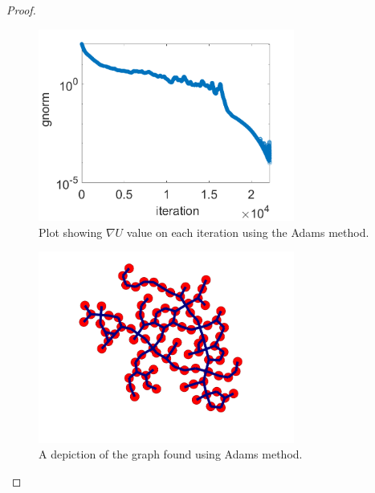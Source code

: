 \documentclass[12pt]{report}
\newenvironment{problem}{}{\newpage}
\begin{document}
\begin{problem}
\begin{proof}
\begin{figure}[h!]
    \centering
    \includegraphics[width=0.75\textwidth,height=\textwidth,keepaspectratio]{images/coolplot2.png}
    \caption{Plot showing $\nabla U$ value on each iteration using the Adams method.}
    \label{fig1}
\end{figure}

\begin{figure}[h!]
    \centering
    \includegraphics[width=0.75\textwidth,height=\textwidth,keepaspectratio]{images/coolplot1.png}
    \caption{A depiction of the graph found using Adams method.}
    \label{fig2}
\end{figure}


\end{proof}
\end{problem}
\end{document}
